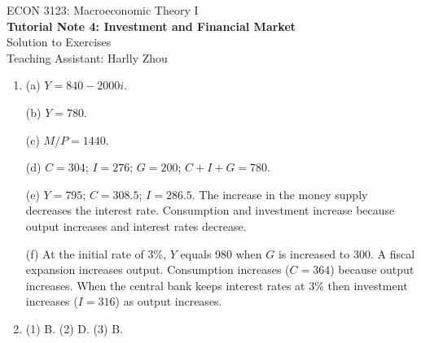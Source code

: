 \documentclass[12pt]{article}
\begin{document}
\begin{center}
    ECON 3123: Macroeconomic Theory I\\
    {\large \textbf{Tutorial Note 4: Investment and Financial Market}}\\
    Solution to Exercises\\
    Teaching Assistant: Harlly Zhou
\end{center}

\begin{enumerate}[label=\arabic*.]
    \item (a) $Y = 840 - 2000 i$.
    
    (b) $Y = 780$.

    (c) $M/P = 1440$.

    (d) $C=304$; $I=276$; $G=200$; $C+I+G=780$.

    (e) $Y = 795$; $C =308.5$; $I = 286.5$. The increase in the money supply decreases the interest rate. Consumption and investment increase because output increases and interest rates decrease.

    (f) At the initial rate of 3\%, $Y$ equals 980 when $G$ is increased to 300. A fiscal expansion increases output. Consumption increases ($C = 364$) because output increases. When the central bank keeps interest rates at 3\% then investment increases ($I = 316$) as output increases.
    \item (1) B. (2) D. (3) B.
\end{enumerate}
\end{document}
